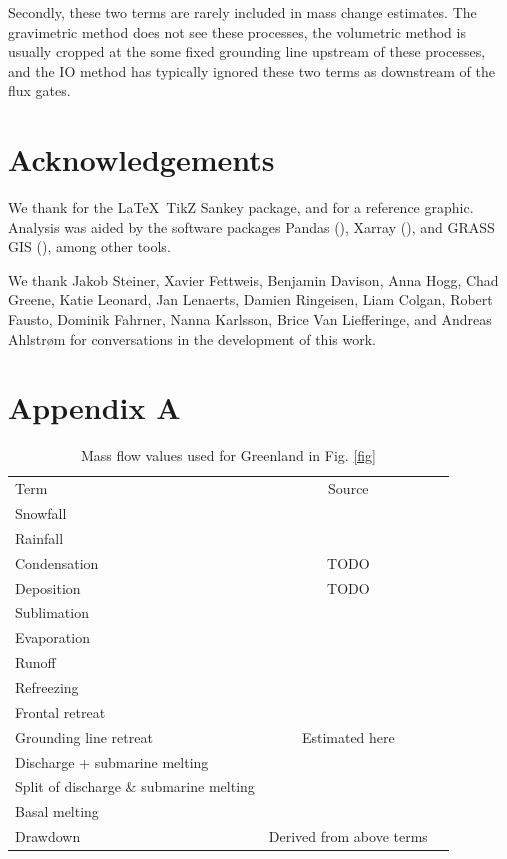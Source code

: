 \documentclass[jog]{igs}
\begin{document}
  Secondly, these two terms are rarely included in mass change estimates. The gravimetric method does not see these processes, the volumetric method is usually cropped at the some fixed grounding line upstream of these processes, and the IO method has typically ignored these two terms as downstream of the flux gates.
  
\section{Acknowledgements}

We thank \citep{sankey} for the \LaTeX\ TikZ Sankey package, and \citet{cogley_2011} for a reference graphic. Analysis was aided by the software packages Pandas (\citet{pandas_team}), Xarray (\citet{xarray}), and GRASS GIS (\citet{GRASS}), among other tools.

We thank Jakob Steiner, Xavier Fettweis, Benjamin Davison, Anna Hogg, Chad Greene, Katie Leonard, Jan Lenaerts, Damien Ringeisen, Liam Colgan, Robert Fausto, Dominik Fahrner, Nanna Karlsson, Brice Van Liefferinge, and Andreas Ahlstrøm for conversations in the development of this work.




\appendix
\section{Appendix A}
\label{sec:appendix:A}

\begin{table}
\caption{Mass flow values used for Greenland in Fig. \ref{fig}}
\label{tab:gl}
\begin{tabular}{@{}lcc}\hline
  Term & Source\\
  Snowfall & \citet{fettweis_2020}\\
  Rainfall & \citet{fettweis_2020}\\
  Condensation & TODO\\
  Deposition & TODO\\
  Sublimation & \citet{fettweis_2020}\\
  Evaporation & \citet{fettweis_2020}\\
  Runoff & \citet{fettweis_2020}\\
  Refreezing & \citet{fettweis_2020}\\
  Frontal retreat & \citet{kochtitzky_2023,greene_2024}\\
  Grounding line retreat & Estimated here\\
  Discharge + submarine melting & \citet{mankoff_2020_solid}\\
  Split of discharge \& submarine melting & \citet{enderlin_2013}\\
  Basal melting & \citet{karlsson_2021}\\
  Drawdown & Derived from above terms
\end{tabular}
\end{table}
\end{document}
